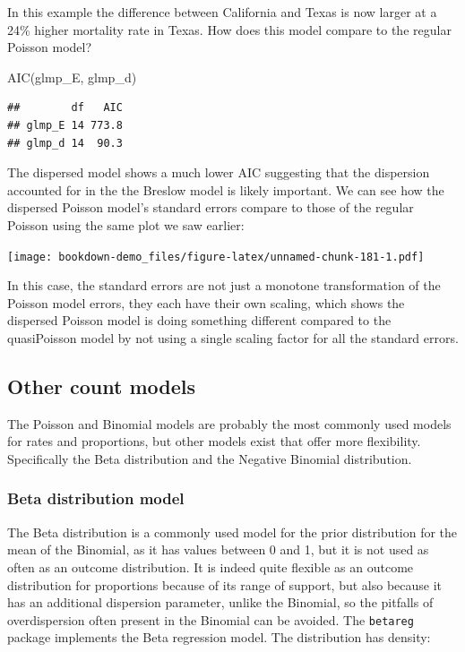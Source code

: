 \documentclass[
]{article}
\newenvironment{Shaded}{\begin{snugshade}}{\end{snugshade}}
\newcommand{\FunctionTok}[1]{\textcolor[rgb]{0.00,0.00,0.00}{#1}}
\newcommand{\NormalTok}[1]{#1}
\begin{document}
In this example the difference between California and Texas is now larger at a 24\% higher mortality rate in Texas. How does this model compare to the regular Poisson model?

\begin{Shaded}
\begin{Highlighting}[]
\FunctionTok{AIC}\NormalTok{(glmp\_E, glmp\_d)}
\end{Highlighting}
\end{Shaded}

\begin{verbatim}
##        df   AIC
## glmp_E 14 773.8
## glmp_d 14  90.3
\end{verbatim}

The dispersed model shows a much lower AIC suggesting that the dispersion accounted for in the the Breslow model is likely important. We can see how the dispersed Poisson model's standard errors compare to those of the regular Poisson using the same plot we saw earlier:

\texttt{[image: bookdown-demo\_files/figure-latex/unnamed-chunk-181-1.pdf]}

In this case, the standard errors are not just a monotone transformation of the Poisson model errors, they each have their own scaling, which shows the dispersed Poisson model is doing something different compared to the quasiPoisson model by not using a single scaling factor for all the standard errors.

\hypertarget{other-count-models}{%
\subsection{Other count models}\label{other-count-models}}

The Poisson and Binomial models are probably the most commonly used models for rates and proportions, but other models exist that offer more flexibility. Specifically the Beta distribution and the Negative Binomial distribution.

\hypertarget{beta-distribution-model}{%
\subsubsection{Beta distribution model}\label{beta-distribution-model}}

The Beta distribution is a commonly used model for the prior distribution for the mean of the Binomial, as it has values between 0 and 1, but it is not used as often as an outcome distribution. It is indeed quite flexible as an outcome distribution for proportions because of its range of support, but also because it has an additional dispersion parameter, unlike the Binomial, so the pitfalls of overdispersion often present in the Binomial can be avoided. The \texttt{betareg} package \citep{betareg} implements the Beta regression model. The distribution has density:
\end{document}
